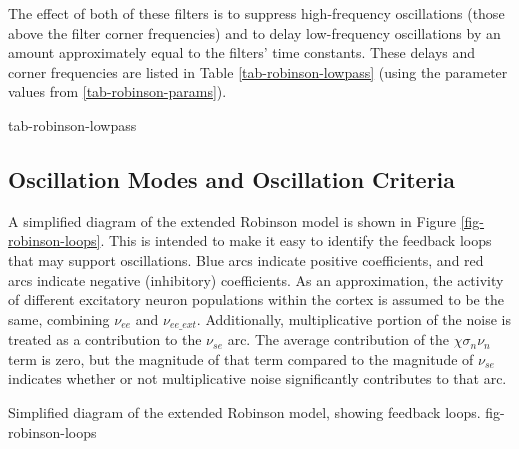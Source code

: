 The effect of both of these filters is to suppress high-frequency
oscillations (those above the filter corner frequencies) and to delay
low-frequency oscillations by an amount approximately equal to the filters'
time constants. These delays and corner frequencies are listed in Table
\ref{tab-robinson-lowpass} (using the parameter values from
\ref{tab-robinson-params}).

{tab-robinson-lowpass}

%
%
\subsection{Oscillation Modes and Oscillation Criteria}
\label{sect-robinson-math-modes}

A simplified diagram of the extended Robinson model is shown in Figure
\ref{fig-robinson-loops}. This is intended to make it easy to identify the
feedback loops that may support oscillations. Blue arcs indicate positive
coefficients, and red arcs indicate negative (inhibitory) coefficients.
As an approximation, the activity of different excitatory neuron populations
within the cortex is assumed to be the same, combining $\nu_{ee}$ and
$\nu_{ee\_ext}$. Additionally, multiplicative portion of the noise is
treated as a contribution to the $\nu_{se}$ arc. The average contribution of
the $\chi \sigma_n \nu_n$ term is zero, but the magnitude of that term
compared to the magnitude of $\nu_{se}$ indicates whether or not
multiplicative noise significantly contributes to that arc.

{Simplified diagram of the extended Robinson model, showing feedback loops.}
{fig-robinson-loops}

